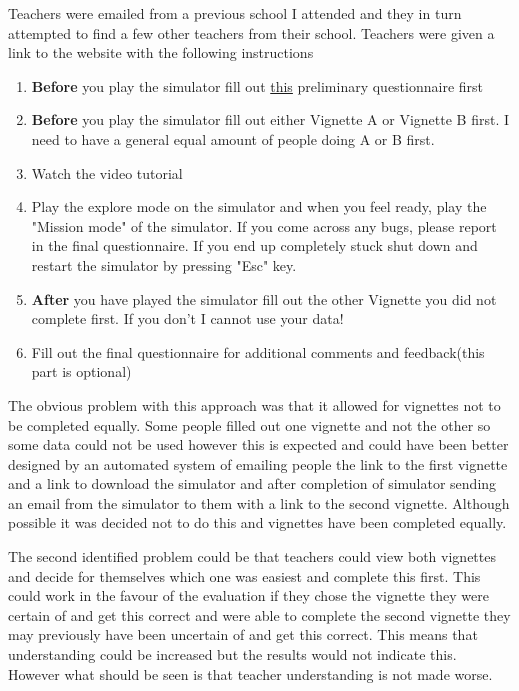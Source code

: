 \documentclass[11pt]{report}
\begin{document}
Teachers were emailed from a previous school I attended and they in turn attempted to find a few other teachers from their school. Teachers were given a link to the website with the following instructions

\begin{enumerate}
\item \textbf{Before} you play the simulator fill out \underline{this} preliminary questionnaire first
\item \textbf{Before} you play the simulator fill out either Vignette A or Vignette B first. I need to have a general equal amount of people doing A or B first.
\item Watch the video tutorial
\item Play the explore mode on the simulator and when you feel ready, play the "Mission mode" of the simulator. If you come across any bugs, please report in the final questionnaire. If you end up completely stuck shut down and restart the simulator by pressing "Esc" key.
\item \textbf{After} you have played the simulator fill out the other Vignette you did not complete first. If you don't I cannot use your data!
\item Fill out the final questionnaire for additional comments and feedback(this part is optional)
\end{enumerate}

The obvious problem with this approach was that it allowed for vignettes not to be completed equally. Some people filled out one vignette and not the other so some data could not be used however this is expected and could have been better designed by an automated system of emailing people the link to the first vignette and a link to download the simulator and after completion of simulator sending an email from the simulator to them with a link to the second vignette. Although possible it was decided not to do this and vignettes have been completed equally.  

The second identified problem could be that teachers could view both vignettes and decide for themselves which one was easiest and complete this first. This could work in the favour of the evaluation if they chose the vignette they were certain of and get this correct and were able to complete the second vignette they may previously have been uncertain of and get this correct. This means that understanding could be increased but the results would not indicate this. However what should be seen is that teacher understanding is not made worse. 
\end{document}
